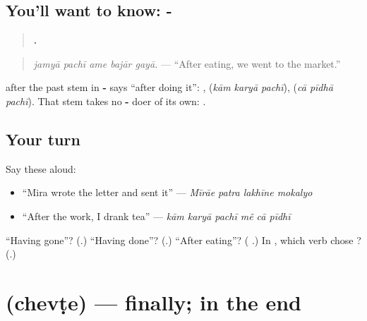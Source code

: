 \subsection*{You'll want to know: - }
\begin{quote}
\textbf{    .}
\end{quote}

\begin{quote}
\emph{jamyā pachī ame bajār gayā.} — \textquotedblleft{}After eating, we went to the market.\textquotedblright{}
\end{quote}

\textbf{} after the past stem in \textbf{-} says \textquotedblleft{}after doing it\textquotedblright{}: \textbf{ }, \textbf{  } (\emph{kām karyā pachī}), \textbf{  } (\emph{cā pīdhā pachī}). That stem takes no \textbf{-} doer of its own: \textbf{     }.

\subsection*{Your turn}
Say these aloud:

\begin{itemize}
\raggedright
  \item \textquotedblleft{}Mira wrote the letter and sent it\textquotedblright{} — \emph{Mīrāe patra lakhīne mokalyo}
  \item \textquotedblleft{}After the work, I drank tea\textquotedblright{} — \emph{kām karyā pachī mẽ cā pīdhī}
\end{itemize}

\begin{tcolorbox}[breakable,colback=teal!4,colframe=teal!35!black,title={Before you move on}]
\textquotedblleft{}Having gone\textquotedblright{}? (\textbf{}.) \textquotedblleft{}Having done\textquotedblright{}? (\textbf{}.) \textquotedblleft{}After eating\textquotedblright{}? (\textbf{ }.) In \textbf{   }, which verb chose \textbf{}? (\textbf{}.)
\end{tcolorbox}
\section[\texorpdfstring{\gu{છેવટે} (chevṭe)}{છેવટે (chevṭe)}]{ (chevṭe) — finally; in the end}

